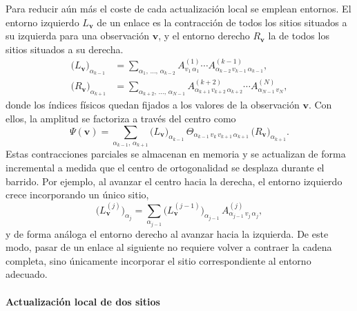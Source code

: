 \documentclass[12pt]{extarticle}
\numberwithin{equation}{section}
\begin{document}
\begin{refsection}
Para reducir aún más el coste de cada actualización local se emplean entornos. El entorno izquierdo $L_{\mathbf{v}}$ de un enlace es la contracción de todos los sitios situados a su izquierda para una observación $\mathbf{v}$, y el entorno derecho $R_{\mathbf{v}}$ la de todos los sitios situados a su derecha. 
\begin{align}
    \bigl(L_{\mathbf{v}}\bigr)_{\alpha_{k-1}}
    &= \sum_{\alpha_1,\, \ldots,\, \alpha_{k-2}}
       A^{(1)}_{v_1\, \alpha_1}
       \cdots
       A^{(k-1)}_{\alpha_{k-2}\, v_{k-1}\, \alpha_{k-1}} ,
    \label{eq:envL}\\[2pt]
    \bigl(R_{\mathbf{v}}\bigr)_{\alpha_{k+1}}
    &= \sum_{\alpha_{k+2},\, \ldots,\, \alpha_{N-1}}
       A^{(k+2)}_{\alpha_{k+1}\, v_{k+2}\, \alpha_{k+2}}
       \cdots
       A^{(N)}_{\alpha_{N-1}\, v_N} ,
    \label{eq:envR}
\end{align}
donde los índices físicos quedan fijados a los valores de la observación $\mathbf{v}$.
Con ellos, la amplitud se factoriza a través del centro como
\begin{equation}
    \Psi(\mathbf{v})
    = \sum_{\alpha_{k-1},\, \alpha_{k+1}}
      \bigl(L_{\mathbf{v}}\bigr)_{\alpha_{k-1}}\,
      \Theta_{\alpha_{k-1}\, v_k\, v_{k+1}\, \alpha_{k+1}}\,
      \bigl(R_{\mathbf{v}}\bigr)_{\alpha_{k+1}} .
    \label{eq:psienv}
\end{equation}
Estas contracciones parciales se almacenan en memoria y se actualizan de forma incremental a medida que el centro de ortogonalidad se desplaza durante el barrido. Por ejemplo, al avanzar el centro hacia la derecha, el entorno izquierdo crece incorporando un único sitio,
\begin{equation}
    \bigl(L^{(j)}_{\mathbf{v}}\bigr)_{\alpha_j}
    = \sum_{\alpha_{j-1}}
      \bigl(L^{(j-1)}_{\mathbf{v}}\bigr)_{\alpha_{j-1}}\,
      A^{(j)}_{\alpha_{j-1}\, v_j\, \alpha_j} ,
    \label{eq:envupdate}
\end{equation}
y de forma análoga el entorno derecho al avanzar hacia la izquierda. De este modo, pasar de un enlace al siguiente no requiere volver a contraer la cadena completa, sino únicamente incorporar el sitio correspondiente al entorno adecuado.

\paragraph{Actualización local de dos sitios}
\mbox{}\\


\end{refsection}
\end{document}
